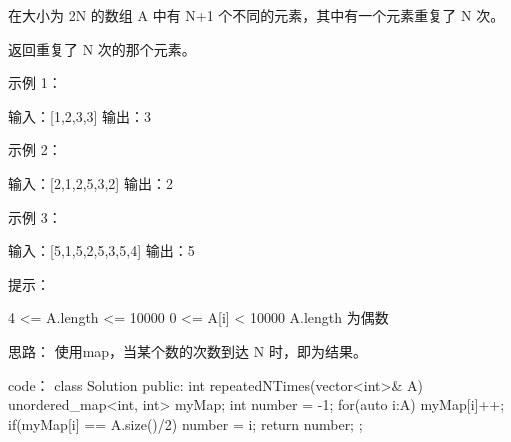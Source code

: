 在大小为 2N 的数组 A 中有 N+1 个不同的元素，其中有一个元素重复了 N 次。

返回重复了 N 次的那个元素。

 

示例 1：

输入：[1,2,3,3]
输出：3

示例 2：

输入：[2,1,2,5,3,2]
输出：2

示例 3：

输入：[5,1,5,2,5,3,5,4]
输出：5

 

提示：

    4 <= A.length <= 10000
    0 <= A[i] < 10000
    A.length 为偶数

























思路：
使用map，当某个数的次数到达 N 时，即为结果。

























code：
class Solution {
public:
    int repeatedNTimes(vector<int>& A) {
        unordered_map<int, int> myMap;
        int number = -1;
        for(auto i:A)
        {
            myMap[i]++;
            if(myMap[i] == A.size()/2) number = i;
        }
        return number;
    }
};